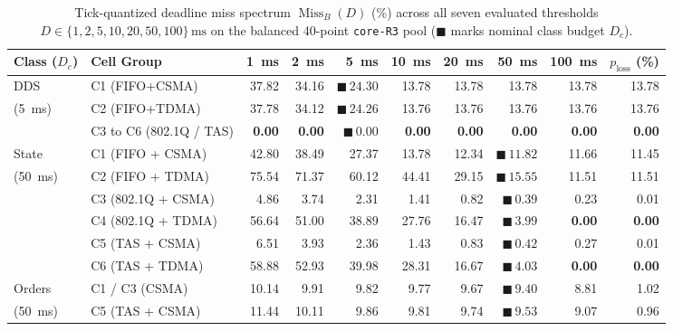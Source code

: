 \documentclass[11pt,a4paper]{article}
\newcommand{\MissB}{\ensuremath{\operatorname{Miss}_B}}
\newcommand{\ploss}{\ensuremath{p_{\mathrm{loss}}}}
\begin{document}
\begin{table}[!tb]
\centering
\footnotesize
\setlength{\tabcolsep}{3.8pt}
\caption{Tick-quantized deadline miss spectrum $\MissB(D)$ (\%) across all seven evaluated thresholds $D \in \{1, 2, 5, 10, 20, 50, 100\}\,\text{ms}$ on the balanced 40-point \texttt{core-R3} pool ($\blacksquare$ marks nominal class budget $D_c$).}
\label{tab:deadline_spectrum}
\begin{tabular}{l l r r r r r r r r}
\toprule
\textbf{Class ($D_c$)} & \textbf{Cell Group} & \textbf{\qty{1}{\milli\second}} & \textbf{\qty{2}{\milli\second}} & \textbf{\qty{5}{\milli\second}} & \textbf{\qty{10}{\milli\second}} & \textbf{\qty{20}{\milli\second}} & \textbf{\qty{50}{\milli\second}} & \textbf{\qty{100}{\milli\second}} & \textbf{$\ploss$ (\%)} \\
\midrule
DDS & C1 (FIFO+CSMA) & 37.82 & 34.16 & $\blacksquare\,\mathbf{24.30}$ & 13.78 & 13.78 & 13.78 & 13.78 & 13.78 \\
(\qty{5}{\milli\second}) & C2 (FIFO+TDMA) & 37.78 & 34.12 & $\blacksquare\,\mathbf{24.26}$ & 13.76 & 13.76 & 13.76 & 13.76 & 13.76 \\
 & C3 to C6 (802.1Q / TAS) & \textbf{0.00} & \textbf{0.00} & $\blacksquare\,\mathbf{0.00}$ & \textbf{0.00} & \textbf{0.00} & \textbf{0.00} & \textbf{0.00} & \textbf{0.00} \\
\midrule
State & C1 (FIFO + CSMA) & 42.80 & 38.49 & 27.37 & 13.78 & 12.34 & $\blacksquare\,\mathbf{11.82}$ & 11.66 & 11.45 \\
(\qty{50}{\milli\second}) & C2 (FIFO + TDMA) & 75.54 & 71.37 & 60.12 & 44.41 & 29.15 & $\blacksquare\,\mathbf{15.55}$ & 11.51 & 11.51 \\
 & C3 (802.1Q + CSMA) & 4.86 & 3.74 & 2.31 & 1.41 & 0.82 & $\blacksquare\,\mathbf{0.39}$ & 0.23 & 0.01 \\
 & C4 (802.1Q + TDMA) & 56.64 & 51.00 & 38.89 & 27.76 & 16.47 & $\blacksquare\,\mathbf{3.99}$ & \textbf{0.00} & \textbf{0.00} \\
 & C5 (TAS + CSMA) & 6.51 & 3.93 & 2.36 & 1.43 & 0.83 & $\blacksquare\,\mathbf{0.42}$ & 0.27 & 0.01 \\
 & C6 (TAS + TDMA) & 58.88 & 52.93 & 39.98 & 28.31 & 16.67 & $\blacksquare\,\mathbf{4.03}$ & \textbf{0.00} & \textbf{0.00} \\
\midrule
Orders & C1 / C3 (CSMA) & 10.14 & 9.91 & 9.82 & 9.77 & 9.67 & $\blacksquare\,\mathbf{9.40}$ & 8.81 & 1.02 \\
(\qty{50}{\milli\second}) & C5 (TAS + CSMA) & 11.44 & 10.11 & 9.86 & 9.81 & 9.74 & $\blacksquare\,\mathbf{9.53}$ & 9.07 & 0.96 \\

\end{tabular}
\end{table}
\end{document}
